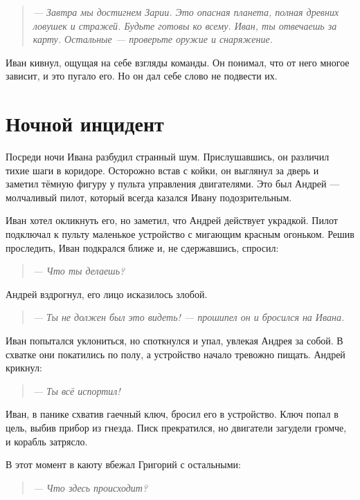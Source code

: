 \documentclass[12pt,a4paper]{book}
\newenvironment{dialogue}{\begin{quote}\itshape}{\end{quote}} %
\begin{document}
\begin{dialogue}
--- Завтра мы достигнем Зарии. Это опасная планета, полная древних ловушек и стражей. Будьте готовы ко всему. Иван, ты отвечаешь за карту. Остальные --- проверьте оружие и снаряжение.
\end{dialogue}

Иван кивнул, ощущая на себе взгляды команды. Он понимал, что от него многое зависит, и это пугало его. Но он дал себе слово не подвести их.

\section*{Ночной инцидент}

Посреди ночи Ивана разбудил странный шум. Прислушавшись, он различил тихие шаги в коридоре. Осторожно встав с койки, он выглянул за дверь и заметил тёмную фигуру у пульта управления двигателями. Это был Андрей --- молчаливый пилот, который всегда казался Ивану подозрительным.

Иван хотел окликнуть его, но заметил, что Андрей действует украдкой. Пилот подключал к пульту маленькое устройство с мигающим красным огоньком. Решив проследить, Иван подкрался ближе и, не сдержавшись, спросил:

\begin{dialogue}
--- Что ты делаешь?
\end{dialogue}

Андрей вздрогнул, его лицо исказилось злобой.

\begin{dialogue}
--- Ты не должен был это видеть! --- прошипел он и бросился на Ивана.
\end{dialogue}

Иван попытался уклониться, но споткнулся и упал, увлекая Андрея за собой. В схватке они покатились по полу, а устройство начало тревожно пищать. Андрей крикнул:

\begin{dialogue}
--- Ты всё испортил!
\end{dialogue}

Иван, в панике схватив гаечный ключ, бросил его в устройство. Ключ попал в цель, выбив прибор из гнезда. Писк прекратился, но двигатели загудели громче, и корабль затрясло.

В этот момент в каюту вбежал Григорий с остальными:

\begin{dialogue}
--- Что здесь происходит?
\end{dialogue}
\end{document}
